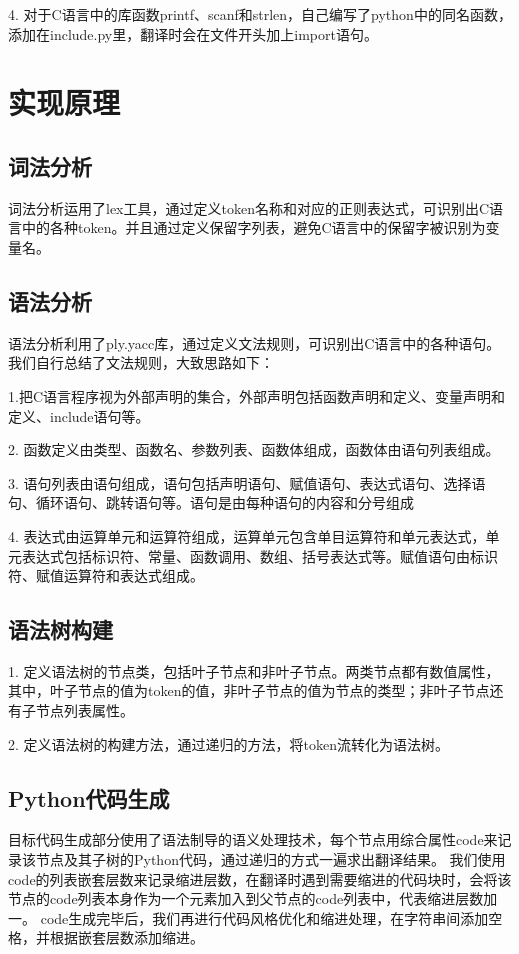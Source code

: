 \documentclass{article}
\begin{document}
4. 对于C语言中的库函数printf、scanf和strlen，自己编写了python中的同名函数，添加在include.py里，翻译时会在文件开头加上import语句。


\section{实现原理}
\subsection{词法分析}
词法分析运用了lex工具，通过定义token名称和对应的正则表达式，可识别出C语言中的各种token。并且通过定义保留字列表，避免C语言中的保留字被识别为变量名。

\subsection{语法分析}
语法分析利用了ply.yacc库，通过定义文法规则，可识别出C语言中的各种语句。
我们自行总结了文法规则，大致思路如下：

1.把C语言程序视为外部声明的集合，外部声明包括函数声明和定义、变量声明和定义、include语句等。

2. 函数定义由类型、函数名、参数列表、函数体组成，函数体由语句列表组成。

3. 语句列表由语句组成，语句包括声明语句、赋值语句、表达式语句、选择语句、循环语句、跳转语句等。语句是由每种语句的内容和分号组成

4. 表达式由运算单元和运算符组成，运算单元包含单目运算符和单元表达式，单元表达式包括标识符、常量、函数调用、数组、括号表达式等。赋值语句由标识符、赋值运算符和表达式组成。


\subsection{语法树构建}
1. 定义语法树的节点类，包括叶子节点和非叶子节点。两类节点都有数值属性，其中，叶子节点的值为token的值，非叶子节点的值为节点的类型；非叶子节点还有子节点列表属性。

2. 定义语法树的构建方法，通过递归的方法，将token流转化为语法树。

\subsection{Python代码生成}
目标代码生成部分使用了语法制导的语义处理技术，每个节点用综合属性code来记录该节点及其子树的Python代码，通过递归的方式一遍求出翻译结果。
我们使用code的列表嵌套层数来记录缩进层数，在翻译时遇到需要缩进的代码块时，会将该节点的code列表本身作为一个元素加入到父节点的code列表中，代表缩进层数加一。
code生成完毕后，我们再进行代码风格优化和缩进处理，在字符串间添加空格，并根据嵌套层数添加缩进。
\end{document}
